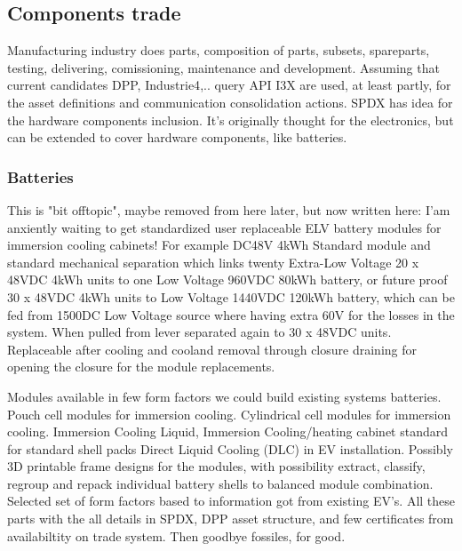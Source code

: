 \subsection{Components trade}\label{component_trade}

Manufacturing industry does parts, composition of parts, subsets, spareparts,
testing, delivering, comissioning, maintenance and development. Assuming that
current candidates DPP\allowbreak\cite{DPP},
Industrie4\allowbreak\cite{Industrie4x},.. query API
I3X\allowbreak\cite{I3X} are used, at least partly, for the asset definitions
and communication consolidation actions. SPDX has idea for the hardware
components inclusion. It's originally thought for the electronics, but can
be extended to cover hardware components, like batteries.

\subsubsection{Batteries}\label{component_battery}

This is "bit offtopic", maybe removed from here later, but now written here:
I'am anxiently waiting to get standardized user replaceable ELV battery
modules for immersion cooling cabinets! For example DC48V 4kWh Standard
module and standard mechanical separation which links twenty Extra-Low
Voltage 20 x 48VDC 4kWh units to one Low Voltage 960VDC 80kWh battery, or
future proof 30 x 48VDC 4kWh units to Low Voltage 1440VDC 120kWh battery,
which can be fed from 1500DC Low Voltage source where having extra 60V for
the losses in the system. When pulled from lever separated again to 30 x 48VDC
units. Replaceable after cooling and cooland removal through closure draining
for opening the closure for the module replacements.

Modules available in few form factors we could build existing systems
batteries. Pouch cell modules for immersion cooling. Cylindrical cell modules
for immersion cooling. Immersion Cooling Liquid, Immersion Cooling/heating
cabinet standard for standard shell packs Direct Liquid Cooling (DLC) in EV
installation. Possibly 3D printable frame designs for the modules, with
possibility extract, classify, regroup and repack individual battery shells
to balanced module combination. Selected set of form factors based to
information got from existing EV's. All these parts with the all details in
SPDX, DPP asset structure, and few certificates from availabiltity on trade
system. Then goodbye fossiles, for good.

